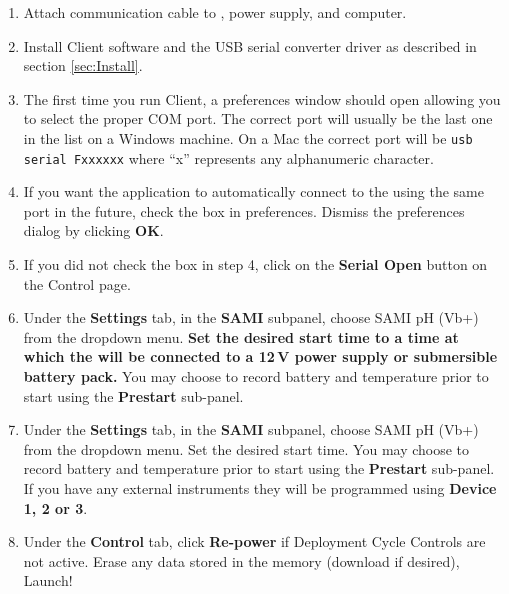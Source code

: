 \begin{enumerate}
\or			%

    \item Attach communication cable to \instType{}, power supply, and computer.
    
\fi    
    
    \item Install \instType{} Client software and the USB serial converter driver as described in section \ref{sec:Install}.
    
    \item The first time you run \instType{} Client, a preferences window should open allowing you to select the proper COM port.  The correct port will usually be the last one in the list on a Windows machine.  On a Mac the correct port will be \verb|usb serial Fxxxxxx| where ``x'' represents any alphanumeric character.
    
    \item If you want the application to automatically connect to the \instType{} using the same port in the future, check the box in preferences.  Dismiss the preferences dialog by clicking \textbf{OK}.
    
    \item If you did not check the box in step 4, click on the \textbf{Serial Open} button on the Control page.
    
    \ifcase \inst	%
    
        \item Under the \textbf{Settings} tab, in the \textbf{SAMI} subpanel, choose SAMI pH (Vb+) from the dropdown menu.  \textbf{Set the desired \instType{} start time to a time at which the \instType{} will be connected to a 12\,V power supply or submersible battery pack.}  You may choose to record battery and temperature prior to start using the \textbf{Prestart} sub-panel.
        
    \else		%
    
        \item Under the \textbf{Settings} tab, in the \textbf{SAMI} subpanel, choose SAMI pH (Vb+) from the dropdown menu.  Set the desired \instType{} start time.  You may choose to record battery and temperature prior to start using the \textbf{Prestart} sub-panel.  If you have any external instruments they will be programmed using \textbf{Device 1, 2 or 3}.

    \fi
    
    \item Under the \textbf{Control} tab, click \textbf{Re-power} if Deployment Cycle Controls are not active.  Erase any data stored in the memory (download if desired), Launch!
    

\end{enumerate}
